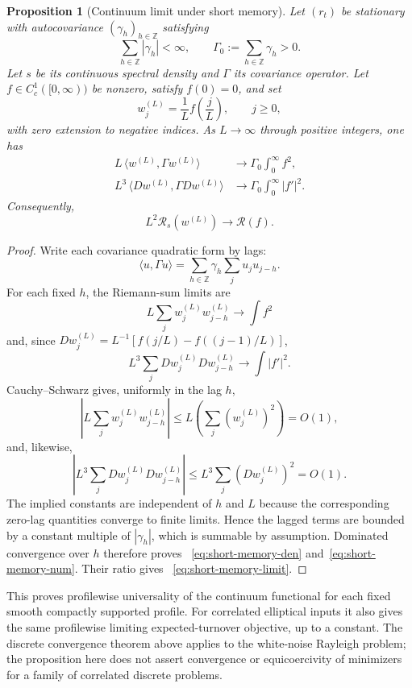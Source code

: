 \documentclass[11pt]{article}
\newtheorem{proposition}[theorem]{Proposition}
\theoremstyle{definition}
\theoremstyle{remark}
\newcommand{\Rcal}{\mathcal R}
\begin{document}
\begin{proposition}[Continuum limit under short memory]\label{prop:short-memory}
Let $(r_t)$ be stationary with autocovariance $(\gamma_h)_{h\in\mathbb Z}$
satisfying
\[
 \sum_{h\in\mathbb Z}|\gamma_h|<\infty,
 \qquad
 \Gamma_0:=\sum_{h\in\mathbb Z}\gamma_h>0.
\]
Let $s$ be its continuous spectral density and $\Gamma$ its covariance
operator.
Let $f\in C_c^1([0,\infty))$ be nonzero, satisfy $f(0)=0$, and set
\[
 w_j^{(L)}=\frac1L f\!\left(\frac jL\right),
 \qquad j\geq0,
\]
with zero extension to negative indices. As $L\to\infty$ through positive
integers, one has
\begin{align}
 L\,\langle w^{(L)},\Gamma w^{(L)}\rangle
 &\longrightarrow \Gamma_0\int_0^\infty f^2,\label{eq:short-memory-den}\\
 L^3\,\langle Dw^{(L)},\Gamma Dw^{(L)}\rangle
 &\longrightarrow \Gamma_0\int_0^\infty |f'|^2.\label{eq:short-memory-num}
\end{align}
Consequently,
\begin{equation}\label{eq:short-memory-limit}
 L^2\Rcal_s(w^{(L)})\longrightarrow\Rcal(f).
\end{equation}
\end{proposition}
\begin{proof}
Write each covariance quadratic form by lags:
\[
 \langle u,\Gamma u\rangle
 =\sum_{h\in\mathbb Z}\gamma_h\sum_j u_j u_{j-h}.
\]
For each fixed $h$, the Riemann-sum limits are
\[
 L\sum_j w_j^{(L)}w_{j-h}^{(L)}\longrightarrow\int f^2
\]
and, since
$Dw_j^{(L)}=L^{-1}[f(j/L)-f((j-1)/L)]$,
\[
 L^3\sum_j Dw_j^{(L)}Dw_{j-h}^{(L)}\longrightarrow\int|f'|^2.
\]
Cauchy--Schwarz gives, uniformly in the lag $h$,
\[
\left|L\sum_j w_j^{(L)}w_{j-h}^{(L)}\right|
\leq L\left(\sum_j (w_j^{(L)})^2\right)=O(1),
\]
and, likewise,
\[
\left|L^3\sum_j Dw_j^{(L)}Dw_{j-h}^{(L)}\right|
\leq L^3\sum_j (Dw_j^{(L)})^2=O(1).
\]
The implied constants are independent of $h$ and $L$ because the corresponding
zero-lag quantities converge to finite limits. Hence the lagged terms are
bounded by a constant multiple of $|\gamma_h|$, which is summable by assumption.
Dominated convergence over $h$ therefore proves
~\eqref{eq:short-memory-den} and~\eqref{eq:short-memory-num}. Their ratio gives
~\eqref{eq:short-memory-limit}.
\end{proof}

This proves profilewise universality of the continuum functional for each
fixed smooth compactly supported profile. For correlated elliptical inputs it
also gives the same profilewise limiting expected-turnover objective, up to a
constant. The discrete convergence theorem above applies to the white-noise
Rayleigh problem; the proposition here does not assert convergence or
equicoercivity of minimizers for a family of correlated discrete problems.
\end{document}

